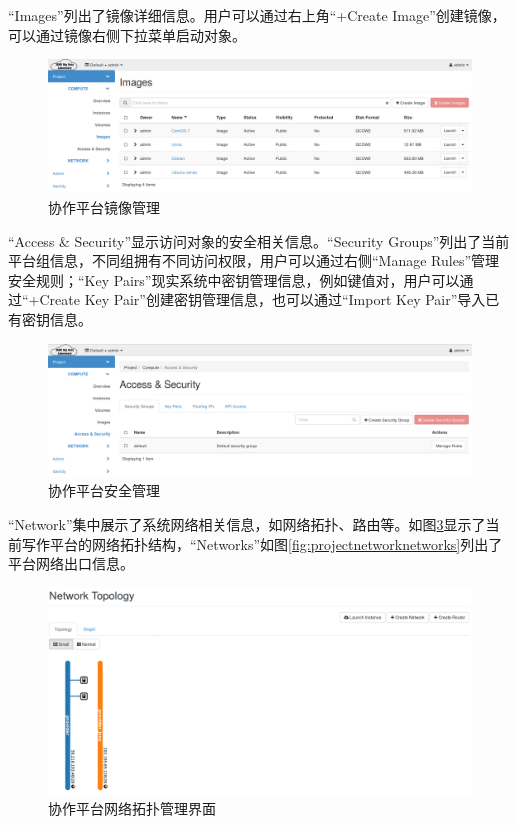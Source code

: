 \documentclass[12pt]{article}
\begin{document}
``Images''列出了镜像详细信息。用户可以通过右上角``+Create Image''创建镜像，可以通过镜像右侧下拉菜单启动对象。
\begin{figure}[!htb]
\centering
\includegraphics[width=6in]{./figures/Project_Compute_Images}
\caption{协作平台镜像管理}
\label{fig:projectcomputeimages}
\end{figure}
``Access \& Security''显示访问对象的安全相关信息。``Security Groups''列出了当前平台组信息，不同组拥有不同访问权限，用户可以通过右侧``Manage Rules''管理安全规则；``Key Pairs''现实系统中密钥管理信息，例如键值对，用户可以通过``+Create Key Pair''创建密钥管理信息，也可以通过``Import Key Pair''导入已有密钥信息。
\begin{figure}[!htb]
\centering
\includegraphics[width=6in]{./figures/Project_Compute_AccessSecurity}
\caption{协作平台安全管理}
\label{fig:projectcomputeAccessSecurity}
\end{figure}
``Network''集中展示了系统网络相关信息，如网络拓扑、路由等。如图\ref{fig:projectnetworktopology}显示了当前写作平台的网络拓扑结构，``Networks''如图\ref{fig:projectnetworknetworks}列出了平台网络出口信息。
\begin{figure}[!htb]
\centering
\includegraphics[width=6in]{./figures/Project_Network_Topology}
\caption{协作平台网络拓扑管理界面}
\label{fig:projectnetworktopology}
\end{figure}
\end{document}
